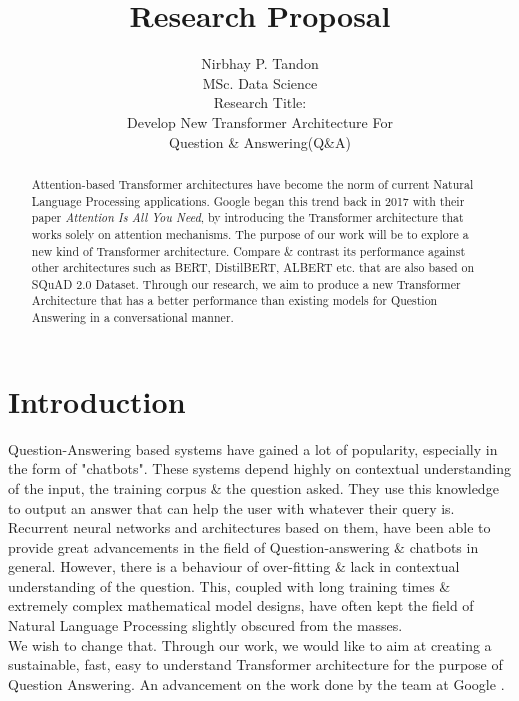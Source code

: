 \documentclass[11pt]{article}
\begin{document}
	
	\title{Research Proposal}
	
	\author{Nirbhay P. Tandon\\MSc. Data Science\\
		Research Title:\\Develop New Transformer Architecture For \\ Question \& Answering(Q\&A)
	}
	\date{}
	\maketitle
	
	\newpage
	\begin{abstract}
		Attention-based Transformer architectures have become the norm of current Natural Language Processing applications. Google began this trend back in 2017 with their paper \textit{Attention Is All You Need}, by introducing the Transformer architecture that works solely on attention mechanisms. The purpose of our work will be to explore a new kind of Transformer architecture. Compare \& contrast its performance against other architectures such as BERT, DistilBERT, ALBERT etc. that are also based on SQuAD 2.0 Dataset. Through our research, we aim to produce a new Transformer Architecture that has a better performance than existing models for Question Answering in a conversational manner.
	\end{abstract}
	\newpage
	\tableofcontents
	\newpage
	\listoffigures
	\newpage
	\section{Introduction}\label{introduction}
	
	Question-Answering based systems have gained a lot of popularity, especially in the form of "chatbots". These systems depend highly on contextual understanding of the input, the training corpus \& the question asked. They use this knowledge to output an answer that can help the user with whatever their query is. Recurrent neural networks and architectures based on them, have been able to provide great advancements in the field of Question-answering \& chatbots in general. However, there is a behaviour of over-fitting \& lack in contextual understanding of the question. This, coupled with long training times \& extremely complex mathematical model designs, have often kept the field of Natural Language Processing slightly obscured from the masses. 
	\\
	We wish to change that. Through our work, we would like to aim at creating a sustainable, fast, easy to understand Transformer architecture for the purpose of Question Answering. An advancement on the work done by the team at Google  \citep{atayl}.
	
\end{document}
